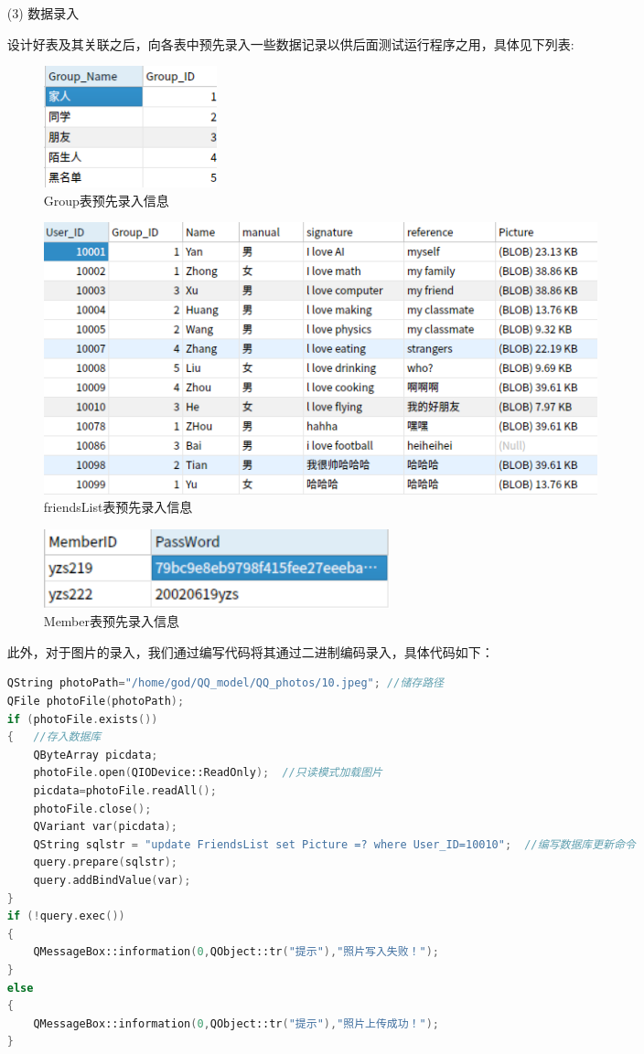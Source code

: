 \documentclass{progartcn}
\begin{document}
\begin{enumerate}[itemsep=0.01pt]
\item[(3)]数据录入

设计好表及其关联之后，向各表中预先录入一些数据记录以供后面测试运行程序之用，具体见下列表:

\begin{figure}[H]
	\centering
	\includegraphics[width=0.25\textwidth]{14.png}
	\caption{\centering Group表预先录入信息}
\end{figure}

\begin{figure}[H]
	\centering
	\includegraphics[width=0.8\textwidth]{15.png}
	\caption{\centering friendsList表预先录入信息}
\end{figure}

\begin{figure}[H]
	\centering
	\includegraphics[width=0.5\textwidth]{16.png}
	\caption{\centering Member表预先录入信息}
\end{figure}

此外，对于图片的录入，我们通过编写代码将其通过二进制编码录入，具体代码如下：

\begin{lstlisting}[language=c++]
QString photoPath="/home/god/QQ_model/QQ_photos/10.jpeg"; //储存路径
QFile photoFile(photoPath);
if (photoFile.exists())
{	//存入数据库
	QByteArray picdata;
	photoFile.open(QIODevice::ReadOnly);  //只读模式加载图片
	picdata=photoFile.readAll();
	photoFile.close();
	QVariant var(picdata);
	QString sqlstr = "update FriendsList set Picture =? where User_ID=10010";  //编写数据库更新命令
	query.prepare(sqlstr);
	query.addBindValue(var);
}
if (!query.exec())
{
	QMessageBox::information(0,QObject::tr("提示"),"照片写入失败！");
}
else
{
	QMessageBox::information(0,QObject::tr("提示"),"照片上传成功！");
}

\end{lstlisting}
\end{enumerate}
\end{document}
